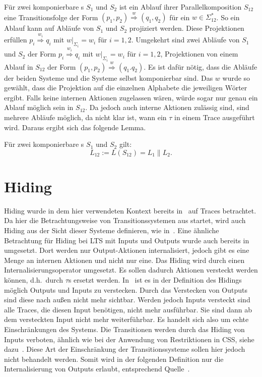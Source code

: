 Für zwei komponierbare \EIO{}s $S_1$ und $S_2$ ist ein Ablauf ihrer
Parallelkomposition $S_{12}$ eine Transitionsfolge der Form $(p_1,p_2)
\overset{w}{\Rightarrow} (q_1,q_2)$ für ein $w\in\Sigma_{12}^*$. So ein Ablauf
kann auf Abläufe von $S_1$ und $S_2$ projiziert werden. Diese Projektionen
erfüllen $p_i \overset{w_i}{\Rightarrow} q_i$ mit $w|_{\Sigma
_i}=w_i$ für $i=1,2$. Umgekehrt sind zwei Abläufe von $S_1$ und $S_2$ der Form
$p_i \overset{w_i}{\Rightarrow} q_i$ mit $w| _{\Sigma _i}= w_i$ für $i=1,2$,
Projektionen von einem Ablauf in $S_{12}$ der Form $(p_1,p_2)
\overset{w}{\Rightarrow} (q_1.q_2)$. Es ist dafür nötig, dass die Abläufe der
beiden Systeme und die Systeme selbst komponierbar sind. Das $w$ wurde so
gewählt, dass die Projektion auf die einzelnen Alphabete die jeweiligen
Wörter ergibt. Falls keine internen Aktionen zugelassen wären, würde sogar nur
genau ein Ablauf möglich sein in $S_{12}$. Da jedoch auch interne Aktionen
zulässig sind, sind mehrere Abläufe möglich, da nicht klar ist, wann ein $\tau$
in einem Trace ausgeführt wird. Daraus ergibt sich das folgende Lemma.

\begin{lem}
\label{LemmaSprache}
  Für zwei komponierbare \EIO{}s $S_1$ und $S_2$ gilt: \[L_{12} := L(S_{12}) =
  L_1\|L_2.\]
\end{lem}

\section{Hiding}

Hiding wurde in dem hier verwendeten Kontext bereits in~\cite{Chilton2013} auf
Traces betrachtet. Da hier die Betrachtungsweise von Transitionssystemen aus
startet, wird auch Hiding aus der Sicht dieser Systeme definieren, wie
in~\cite{Schlosser2012BA}. Eine ähnliche Betrachtung für Hiding bei LTS mit
Inputs und Outputs wurde auch bereits in~\cite{Lynch1996} umgesetzt. Dort
werden nur Output-Aktionen internalisiert, jedoch gibt es eine Menge an
internen Aktionen und nicht nur eine. Das Hiding wird durch einen
Internalisierungsoperator umgesetzt. Es sollen dadurch Aktionen versteckt
werden können, d.h.\ durch $\tau$s ersetzt werden. In~\cite{Chilton2013} ist es
in der Definition des Hidings möglich Outputs und Inputs zu verstecken. Durch
das Verstecken von Outputs sind diese nach außen nicht mehr sichtbar. Werden
jedoch Inputs versteckt sind alle Traces, die diesen Input benötigen, nicht
mehr ausführbar. Sie sind dann ab dem versteckten Input nicht mehr
weiterführbar. Es handelt sich also um echte Einschränkungen des Systems. Die
Transitionen werden durch das Hiding von Inputs verboten, ähnlich wie bei der Anwendung
von Restriktionen in CSS, siehe dazu~\cite{Milner1989}. Diese Art der
Einschränkung der Transitionssysteme sollen hier jedoch nicht behandelt werden.
Somit wird in der folgenden Definition nur die Internalisierung von Outputs
erlaubt, entsprechend Quelle~\cite{Schlosser2012BA}.

